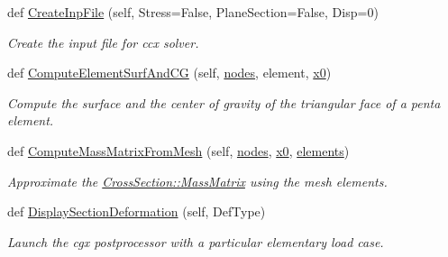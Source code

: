 \begin{DoxyCompactItemize}
def \hyperlink{classgebtaero_1_1_external_mesh_1_1_external_mesh_a54e9efc572ecf40516e5c28a48be0bae}{Create\+Inp\+File} (self, Stress=False, Plane\+Section=False, Disp=0)
\begin{DoxyCompactList}\small\item\em Create the input file for ccx solver. \end{DoxyCompactList}\item 
def \hyperlink{classgebtaero_1_1_external_mesh_1_1_external_mesh_ad2151661d358ae9a36e05f98a7d29dc8}{Compute\+Element\+Surf\+And\+CG} (self, \hyperlink{classgebtaero_1_1_external_mesh_1_1_external_mesh_abb7c716a5f2adf2a1f878b1034dcdc57}{nodes}, element, \hyperlink{classgebtaero_1_1_external_mesh_1_1_external_mesh_acaa3b125cb4f80848007b82426c14ffa}{x0})
\begin{DoxyCompactList}\small\item\em Compute the surface and the center of gravity of the triangular face of a penta element. \end{DoxyCompactList}\item 
def \hyperlink{classgebtaero_1_1_external_mesh_1_1_external_mesh_af2195154db17cc393dab153465e33b59}{Compute\+Mass\+Matrix\+From\+Mesh} (self, \hyperlink{classgebtaero_1_1_external_mesh_1_1_external_mesh_abb7c716a5f2adf2a1f878b1034dcdc57}{nodes}, \hyperlink{classgebtaero_1_1_external_mesh_1_1_external_mesh_acaa3b125cb4f80848007b82426c14ffa}{x0}, \hyperlink{classgebtaero_1_1_external_mesh_1_1_external_mesh_a1a044fbcf39f5f8e7d3e3b98d291010d}{elements})
\begin{DoxyCompactList}\small\item\em Approximate the \hyperlink{classgebtaero_1_1_cross_section_1_1_cross_section_ae9be8649853163b2b4dfdaa3584d9f78}{Cross\+Section\+::\+Mass\+Matrix} using the mesh elements. \end{DoxyCompactList}\item 
def \hyperlink{classgebtaero_1_1_external_mesh_1_1_external_mesh_a6cad952ce309870f33277bb9a89c5ca1}{Display\+Section\+Deformation} (self, Def\+Type)
\begin{DoxyCompactList}\small\item\em Launch the cgx postprocessor with a particular elementary load case. \end{DoxyCompactList}\end{DoxyCompactItemize}
